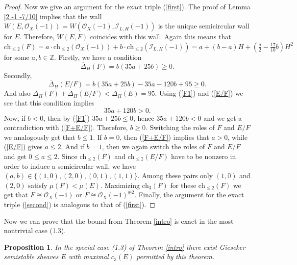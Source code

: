 \documentclass{amsart}
\newtheorem{proposition}[theorem]{Proposition}
\begin{document}
\begin{proof}
	Now we give an argument for the exact triple (\ref{first}). The proof of Lemma \ref{2 -1 -7/10} implies that the wall $W(E,\mathcal O_X(-1))=W(\mathcal O_X(-1),\mathcal I_{L,H}(-1))$ is the unique semicircular wall for $E$. Therefore, $W(E,F)$ coincides with this wall. Again this means that $\mathrm{ch}_{\le 2}(F)=a\cdot\mathrm{ch}_{\le 2}(\mathcal O_X(-1))+b\cdot\mathrm{ch}_{\le 2}(\mathcal I_{L,H}(-1))=a+(b-a)H+(\frac a2-\frac{17}{10}b)H^2$ for some $a,b\in\mathbb Z$. Firstly, we have a condition
		\begin{equation}\label{F1}\overline{\Delta}_H(F)=b(35a+25b)\ge 0.
		\end{equation}
		Secondly,
		\begin{equation}\label{E/F}\overline{\Delta}_H(E/F)=b(35a+25b)-35a-120b+95\ge 0.
		\end{equation}
		And also $\overline{\Delta}_H(F)+\overline{\Delta}_H(E/F)<\overline{\Delta}_H(E)=95.$ Using (\ref{F1}) and (\ref{E/F}) we see that this condition implies
		\begin{equation}\label{F+E/F}35a+120b>0.
		\end{equation}
	Now, if $b<0$, then by (\ref{F1}) $35a+25b\le 0$, hence $35a+120b<0$ and we get a contradiction with (\ref{F+E/F}). Therefore, $b\ge 0$. Switching the roles of $F$ and $E/F$ we analogously get that $b\le 1$. If $b=0$, then (\ref{F+E/F}) implies that $a>0$, while (\ref{E/F}) gives $a\le 2$. And if $b=1$, then we again switch the roles of $F$ and $E/F$ and get $0\le a\le 2$. Since $\mathrm{ch}_{\le 2}(F)$ and $\mathrm{ch}_{\le 2}(E/F)$ have to be nonzero in order to induce a semicircular wall, we have $(a,b)\in\{(1,0),(2,0),(0,1),(1,1)\}$. Among these pairs only $(1,0)$ and $(2,0)$ satisfy $\mu(F)<\mu(E)$. Maximizing $\mathrm{ch}_3(F)$ for these $\mathrm{ch}_{\le 2}(F)$ we get that $F\cong\mathcal O_X(-1)$ or $F\cong\mathcal O_X(-1)^{\oplus 2}$. Finally, the argument for the exact triple (\ref{second}) is analogous to that of (\ref{first}).
\end{proof}

Now we can prove that the bound from Theorem \ref{intro} is exact in the most nontrivial case (1.3).

\begin{proposition}\label{existence2}In the special case (1.3) of Theorem \ref{intro} there exist Gieseker semistable sheaves $E$ with maximal $c_3(E)$ permitted by this theorem.
\end{proposition}
\end{document}
